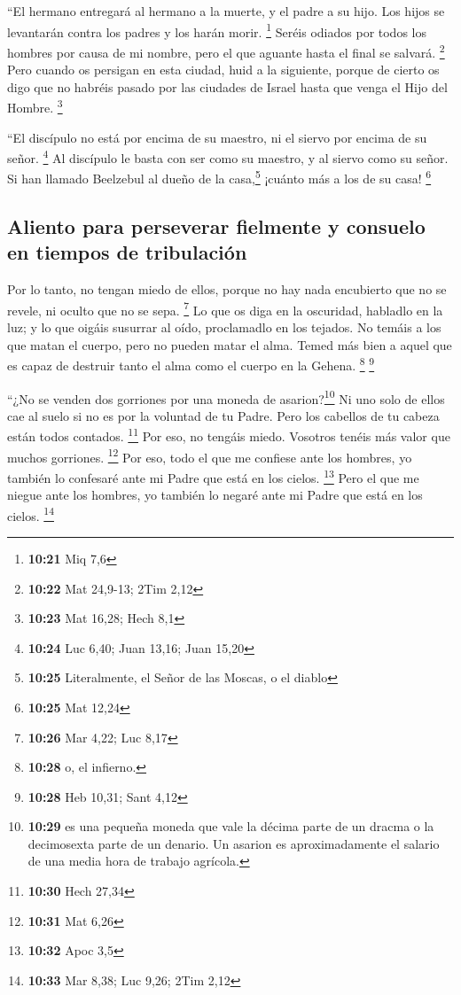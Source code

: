  ``El hermano entregará al hermano a la muerte, y el
padre a su hijo. Los hijos se levantarán contra los padres y los harán
morir. \footnote{\textbf{10:21} Miq 7,6}  Seréis odiados
por todos los hombres por causa de mi nombre, pero el que aguante hasta
el final se salvará. \footnote{\textbf{10:22} Mat 24,9-13; 2Tim 2,12}
 Pero cuando os persigan en esta ciudad, huid a la
siguiente, porque de cierto os digo que no habréis pasado por las
ciudades de Israel hasta que venga el Hijo del Hombre. \footnote{\textbf{10:23}
  Mat 16,28; Hech 8,1}

 ``El discípulo no está por encima de su maestro, ni el
siervo por encima de su señor. \footnote{\textbf{10:24} Luc 6,40; Juan
  13,16; Juan 15,20}  Al discípulo le basta con ser como
su maestro, y al siervo como su señor. Si han llamado Beelzebul al dueño
de la casa,\footnote{\textbf{10:25} Literalmente, el Señor de las
  Moscas, o el diablo} ¡cuánto más a los de su casa! \footnote{\textbf{10:25}
  Mat 12,24}

\hypertarget{aliento-para-perseverar-fielmente-y-consuelo-en-tiempos-de-tribulaciuxf3n}{%
\subsection{Aliento para perseverar fielmente y consuelo en tiempos de
tribulación}\label{aliento-para-perseverar-fielmente-y-consuelo-en-tiempos-de-tribulaciuxf3n}}

 Por lo tanto, no tengan miedo de ellos, porque no hay
nada encubierto que no se revele, ni oculto que no se sepa. \footnote{\textbf{10:26}
  Mar 4,22; Luc 8,17}  Lo que os diga en la oscuridad,
habladlo en la luz; y lo que oigáis susurrar al oído, proclamadlo en los
tejados.  No temáis a los que matan el cuerpo, pero no
pueden matar el alma. Temed más bien a aquel que es capaz de destruir
tanto el alma como el cuerpo en la Gehena. \footnote{\textbf{10:28} o,
  el infierno.} \footnote{\textbf{10:28} Heb 10,31; Sant 4,12}

 ``¿No se venden dos gorriones por una moneda de
asarion?\footnote{\textbf{10:29} es una pequeña moneda que vale la
  décima parte de un dracma o la decimosexta parte de un denario. Un
  asarion es aproximadamente el salario de una media hora de trabajo
  agrícola.} Ni uno solo de ellos cae al suelo si no es por la voluntad
de tu Padre.  Pero los cabellos de tu cabeza están todos
contados. \footnote{\textbf{10:30} Hech 27,34}  Por eso,
no tengáis miedo. Vosotros tenéis más valor que muchos gorriones.
\footnote{\textbf{10:31} Mat 6,26}  Por eso, todo el que
me confiese ante los hombres, yo también lo confesaré ante mi Padre que
está en los cielos. \footnote{\textbf{10:32} Apoc 3,5} 
Pero el que me niegue ante los hombres, yo también lo negaré ante mi
Padre que está en los cielos. \footnote{\textbf{10:33} Mar 8,38; Luc
  9,26; 2Tim 2,12}

